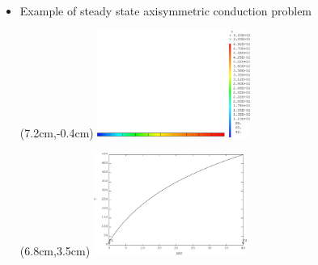 \begin{frame}{}
  \begin{itemize}
    \item {}
             {Example of steady state axisymmetric conduction problem}
    \begin{textblock*}{6cm}(7.2cm,-0.4cm)
      \includegraphics[width=5cm]{images/thermique_2d_axi.1}
    \end{textblock*}
    \begin{textblock*}{6cm}(6.8cm,3.5cm)
      \includegraphics[width=5cm]{images/thermique_2d_axi.2}
    \end{textblock*}
    
  \end{itemize}
  \vspace{1cm}
\end{frame}

